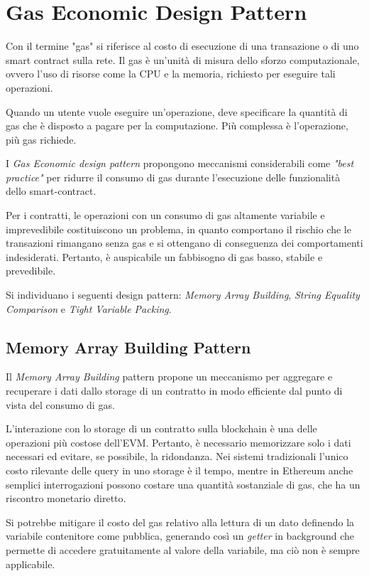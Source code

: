 {\section{Gas Economic Design Pattern}
	Con il termine "gas" si riferisce al costo di esecuzione di una transazione o di uno smart contract sulla rete. Il gas è un'unità di misura dello sforzo computazionale, ovvero l'uso di risorse come la CPU e la memoria, richiesto per eseguire tali operazioni.\par
	Quando un utente vuole eseguire un'operazione, deve specificare la quantità di gas che è disposto a pagare per la computazione. Più complessa è l'operazione, più gas richiede.\par
	I \textit{Gas Economic design pattern} propongono meccanismi considerabili come \textit{"best practice"} per ridurre il consumo di gas durante l'esecuzione delle funzionalità dello smart-contract. \par
	Per i contratti, le operazioni con un consumo di gas altamente variabile e imprevedibile costituiscono un problema, in quanto comportano il rischio che le transazioni rimangano senza gas e si ottengano di conseguenza dei comportamenti indesiderati. Pertanto, è auspicabile un fabbisogno di gas basso, stabile e prevedibile.\par
	Si individuano i seguenti design pattern: \textit{Memory Array Building}, \textit{String Equality Comparison} e \textit{Tight Variable Packing}.
	{\subsection{Memory Array Building Pattern}
		Il \textit{Memory Array Building} pattern propone un meccanismo per aggregare e recuperare i dati dallo storage di un contratto in modo efficiente dal punto di vista del consumo di gas.\par	L'interazione con lo storage di un contratto sulla blockchain è una delle operazioni più costose dell'EVM. Pertanto, è necessario memorizzare solo i dati necessari ed evitare, se possibile, la ridondanza. Nei sistemi tradizionali l'unico costo rilevante delle query in uno storage è il tempo, mentre in Ethereum anche semplici interrogazioni possono costare una quantità sostanziale di gas, che ha un riscontro monetario diretto.\par
		Si potrebbe mitigare il costo del gas relativo alla lettura di un dato definendo la variabile contenitore come pubblica, generando così un \textit{getter} in background che permette di accedere gratuitamente al valore della variabile, ma ciò non è sempre applicabile.
}}
